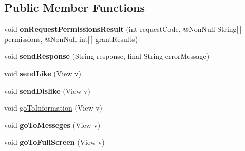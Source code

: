 \subsection*{Public Member Functions}
\begin{DoxyCompactItemize}
\item 
void {\bfseries on\+Request\+Permissions\+Result} (int request\+Code, @Non\+Null String\mbox{[}$\,$\mbox{]} permissions, @Non\+Null int\mbox{[}$\,$\mbox{]} grant\+Results)\hypertarget{classcom_1_1example_1_1sebastian_1_1tindertp_1_1MatchingActivity_a206e6cec7bb1a84e4e30592c5409b74d}{}\label{classcom_1_1example_1_1sebastian_1_1tindertp_1_1MatchingActivity_a206e6cec7bb1a84e4e30592c5409b74d}

\item 
void {\bfseries send\+Response} (String response, final String error\+Message)\hypertarget{classcom_1_1example_1_1sebastian_1_1tindertp_1_1MatchingActivity_a074e2aa018a3f0c747b2847ea8148b1b}{}\label{classcom_1_1example_1_1sebastian_1_1tindertp_1_1MatchingActivity_a074e2aa018a3f0c747b2847ea8148b1b}

\item 
void {\bfseries send\+Like} (View v)\hypertarget{classcom_1_1example_1_1sebastian_1_1tindertp_1_1MatchingActivity_aaac2d32f3fa7f049c705f3ab41dce15f}{}\label{classcom_1_1example_1_1sebastian_1_1tindertp_1_1MatchingActivity_aaac2d32f3fa7f049c705f3ab41dce15f}

\item 
void {\bfseries send\+Dislike} (View v)\hypertarget{classcom_1_1example_1_1sebastian_1_1tindertp_1_1MatchingActivity_ab767385c590b24f38a900a8d3e654ba5}{}\label{classcom_1_1example_1_1sebastian_1_1tindertp_1_1MatchingActivity_ab767385c590b24f38a900a8d3e654ba5}

\item 
void \hyperlink{classcom_1_1example_1_1sebastian_1_1tindertp_1_1MatchingActivity_a92e5feb9b14200be7e31f5069c305946}{go\+To\+Information} (View v)
\item 
void {\bfseries go\+To\+Messeges} (View v)\hypertarget{classcom_1_1example_1_1sebastian_1_1tindertp_1_1MatchingActivity_a3fb08eda023bf9fe146209008d556d26}{}\label{classcom_1_1example_1_1sebastian_1_1tindertp_1_1MatchingActivity_a3fb08eda023bf9fe146209008d556d26}

\item 
void {\bfseries go\+To\+Full\+Screen} (View v)\hypertarget{classcom_1_1example_1_1sebastian_1_1tindertp_1_1MatchingActivity_aa55c98a60dab49fdb2b6facb6daa877f}{}\label{classcom_1_1example_1_1sebastian_1_1tindertp_1_1MatchingActivity_aa55c98a60dab49fdb2b6facb6daa877f}


\end{DoxyCompactItemize}
